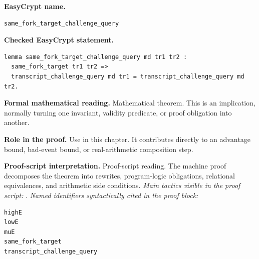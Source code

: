 \begin{formaltheorem}
\noindent\textbf{EasyCrypt name.}
\begin{lstlisting}[language=EasyCrypt,basicstyle=\ttfamily\scriptsize]
same_fork_target_challenge_query
\end{lstlisting}
\noindent\textbf{Checked EasyCrypt statement.}
\begin{lstlisting}[language=EasyCrypt,basicstyle=\ttfamily\scriptsize]
lemma same_fork_target_challenge_query md tr1 tr2 :
  same_fork_target tr1 tr2 =>
  transcript_challenge_query md tr1 = transcript_challenge_query md tr2.
\end{lstlisting}
\noindent\textbf{Formal mathematical reading.}
Mathematical theorem. This is an implication, normally turning one invariant, validity predicate, or proof obligation into another.

\noindent\textbf{Role in the proof.}
Use in this chapter. It contributes directly to an advantage bound, bad-event bound, or real-arithmetic composition step.

\noindent\textbf{Proof-script interpretation.}
Proof-script reading. The machine proof decomposes the theorem into rewrites, program-logic obligations, relational equivalences, and arithmetic side conditions.
\emph{Main tactics visible in the proof script:} .
\emph{Named identifiers syntactically cited in the proof block:}
\begin{lstlisting}[language=EasyCrypt,basicstyle=\ttfamily\scriptsize]
highE
lowE
muE
same_fork_target
transcript_challenge_query
\end{lstlisting}

\end{formaltheorem}

